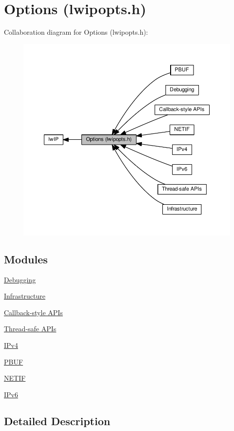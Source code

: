 \hypertarget{group__lwip__opts}{}\section{Options (lwipopts.\+h)}
\label{group__lwip__opts}
Collaboration diagram for Options (lwipopts.\+h)\+:
\nopagebreak
\begin{figure}[H]
\begin{center}
\leavevmode
\includegraphics[width=350pt]{group__lwip__opts}
\end{center}
\end{figure}
\subsection*{Modules}
\begin{DoxyCompactItemize}
\item 
\hyperlink{group__lwip__opts__debug}{Debugging}
\item 
\hyperlink{group__lwip__opts__infrastructure}{Infrastructure}
\item 
\hyperlink{group__lwip__opts__callback}{Callback-\/style A\+P\+Is}
\item 
\hyperlink{group__lwip__opts__threadsafe__apis}{Thread-\/safe A\+P\+Is}
\item 
\hyperlink{group__lwip__opts__ipv4}{I\+Pv4}
\item 
\hyperlink{group__lwip__opts__pbuf}{P\+B\+UF}
\item 
\hyperlink{group__lwip__opts__netif}{N\+E\+T\+IF}
\item 
\hyperlink{group__lwip__opts__ipv6}{I\+Pv6}
\end{DoxyCompactItemize}


\subsection{Detailed Description}

